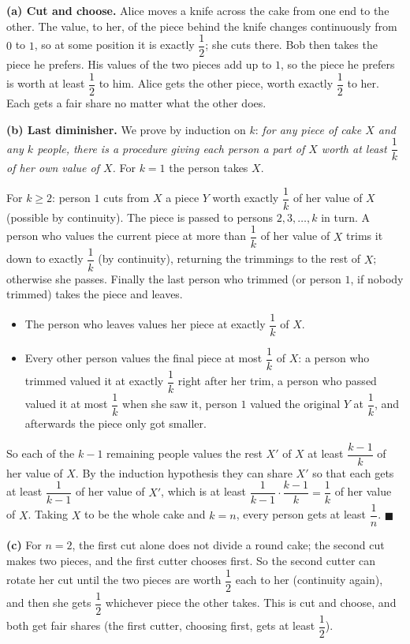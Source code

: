 \textbf{(a) Cut and choose.} Alice moves a knife across the cake from one end to the other. The value, to her, of the piece behind the knife changes continuously from $0$ to $1$, so at some position it is exactly $\dfrac{1}{2}$; she cuts there. Bob then takes the piece he prefers. His values of the two pieces add up to $1$, so the piece he prefers is worth at least $\dfrac{1}{2}$ to him. Alice gets the other piece, worth exactly $\dfrac{1}{2}$ to her. Each gets a fair share no matter what the other does.

\textbf{(b) Last diminisher.} We prove by induction on $k$: \emph{for any piece of cake $X$ and any $k$ people, there is a procedure giving each person a part of $X$ worth at least $\dfrac{1}{k}$ of her own value of $X$.} For $k=1$ the person takes $X$.

For $k\ge2$: person $1$ cuts from $X$ a piece $Y$ worth exactly $\dfrac{1}{k}$ of her value of $X$ (possible by continuity). The piece is passed to persons $2,3,\dots,k$ in turn. A person who values the current piece at more than $\dfrac{1}{k}$ of her value of $X$ trims it down to exactly $\dfrac{1}{k}$ (by continuity), returning the trimmings to the rest of $X$; otherwise she passes. Finally the last person who trimmed (or person $1$, if nobody trimmed) takes the piece and leaves.
\begin{itemize}
\item The person who leaves values her piece at exactly $\dfrac{1}{k}$ of $X$.
\item Every other person values the final piece at most $\dfrac{1}{k}$ of $X$: a person who trimmed valued it at exactly $\dfrac{1}{k}$ right after her trim, a person who passed valued it at most $\dfrac{1}{k}$ when she saw it, person $1$ valued the original $Y$ at $\dfrac{1}{k}$, and afterwards the piece only got smaller.
\end{itemize}
So each of the $k-1$ remaining people values the rest $X'$ of $X$ at least $\dfrac{k-1}{k}$ of her value of $X$. By the induction hypothesis they can share $X'$ so that each gets at least $\dfrac{1}{k-1}$ of her value of $X'$, which is at least $\dfrac{1}{k-1}\cdot\dfrac{k-1}{k}=\dfrac{1}{k}$ of her value of $X$. Taking $X$ to be the whole cake and $k=n$, every person gets at least $\dfrac{1}{n}$. $\blacksquare$

\textbf{(c)} For $n=2$, the first cut alone does not divide a round cake; the second cut makes two pieces, and the first cutter chooses first. So the second cutter can rotate her cut until the two pieces are worth $\dfrac{1}{2}$ each to her (continuity again), and then she gets $\dfrac{1}{2}$ whichever piece the other takes. This is cut and choose, and both get fair shares (the first cutter, choosing first, gets at least $\dfrac{1}{2}$).

